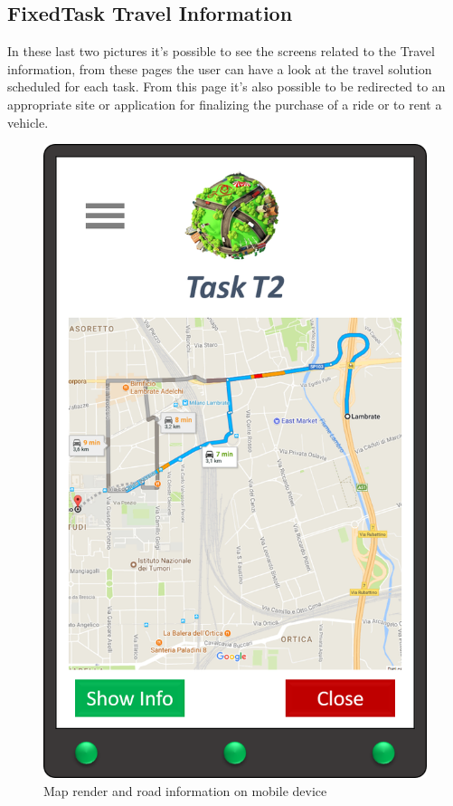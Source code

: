 \subsection*{FixedTask Travel Information}
In these last two pictures it's possible to see the screens related to the Travel information, from these pages the user can have a look at the travel solution scheduled for each task. From this page it's also possible to be redirected to an appropriate site or application for finalizing the purchase of a ride or to rent a vehicle.   

\begin{figure}[H]
    \centering
    \includegraphics[scale=0.3]{Pictures/Mockups/AppMap.png}
    \caption{Map render and road information on mobile device}
\end{figure}

